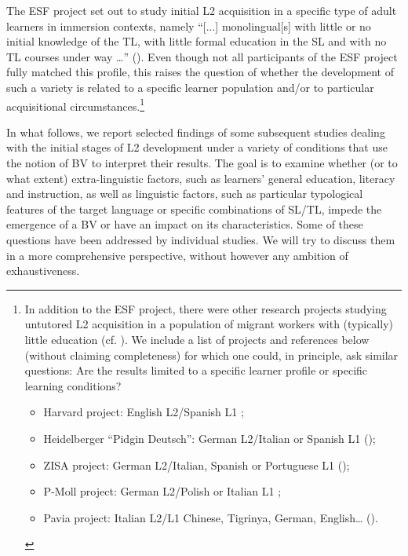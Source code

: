 \documentclass[output=paper]{langscibook}
\begin{document}
The ESF project set out to study initial L2 acquisition in a specific type of adult learners in immersion contexts, namely “[...] monolingual[s] with little or no initial knowledge of the TL, with little formal education in the SL and with no TL courses under way …” (\citealt[42]{Perdue1993vol1}). Even though not all participants of the ESF project fully matched this profile, this raises the question of whether the development of such a variety is related to a specific learner population and/or to particular acquisitional circumstances.\footnote{In addition to the ESF project, there were other research projects studying untutored L2 acquisition in a population of migrant workers with (typically) little education (cf. \citealt{Véronique2021Acquisition}). We include a list of projects and references below (without claiming completeness) for which one could, in principle, ask similar questions: Are the results limited to a specific learner profile or specific learning conditions?\label{fn:benazzo:1}

\begin{itemize}
\item Harvard project: English L2\slash Spanish L1 \citep{CazdenEtAl1975};
\item Heidelberger “Pidgin Deutsch”:  German L2\slash Italian or Spanish L1 (\citealt{KleinDittmar1979});
\item ZISA project: German L2\slash Italian, Spanish or Portuguese L1 (\citealt{MeiselPienemann1981, ClahsenEtAl1983});
\item P-Moll project: German L2\slash Polish or Italian L1 \citep{DittmarEtAl1990};
\item Pavia project: Italian L2\slash L1 Chinese, Tigrinya, German, English… (\citealt{Bernini1994, GiacaloneRamat2003}).
\end{itemize}}

In what follows, we report selected findings of some subsequent studies dealing with the initial stages of L2 development under a variety of conditions that use the notion of BV to interpret their results. The goal is to examine whether (or to what extent) extra-linguistic factors, such as learners’ general education, literacy and instruction, as well as linguistic factors, such as particular typological features of the target language or specific combinations of SL/TL, impede the emergence of a BV or have an impact on its characteristics. Some of these questions have been addressed by individual studies. We will try to discuss them in a more comprehensive perspective, without however any ambition of exhaustiveness. 
\end{document}
